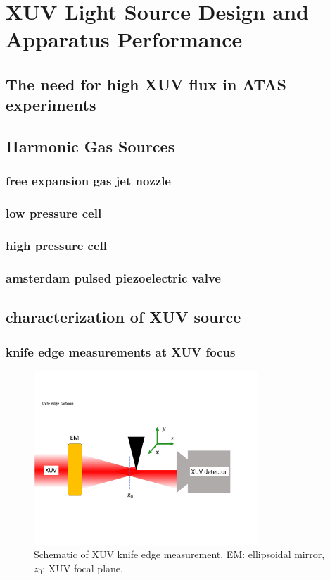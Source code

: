 \chapter{XUV Light Source Design and Apparatus Performance}

\section{The need for high XUV flux in ATAS experiments}

\section{Harmonic Gas Sources}

\subsection{free expansion gas jet nozzle}

\subsection{low pressure cell}

\subsection{high pressure cell}

\subsection{amsterdam pulsed piezoelectric valve}

\section{characterization of XUV source}

\subsection{knife edge measurements at XUV focus}

\begin{figure}
	\centering
	\includegraphics[width=0.75\textwidth]{figures/chap3/knife_edge_cartoon.pdf}
	\caption{Schematic of XUV knife edge measurement. EM: ellipsoidal mirror, $z_0$: XUV focal plane.}
	\label{fig:knife_edge_cartoon}
\end{figure}

